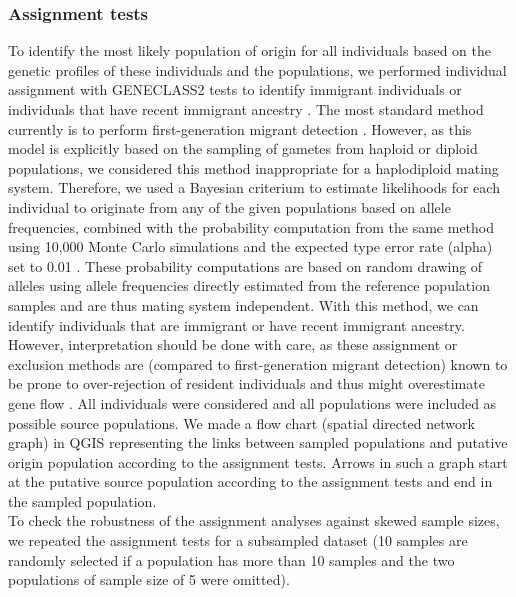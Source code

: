 \documentclass[10pt, twoside]{book} %
\begin{document}
	\subsubsection{Assignment tests}
	To identify the most likely population of origin for all individuals based on the genetic profiles of these individuals and the populations, we performed individual assignment with \textsc{GENECLASS2} tests to identify immigrant individuals or individuals that have recent immigrant ancestry \citep{rannala1997, piry2004}. The most standard method currently is to perform first-generation migrant detection \citep{paetkau2004}. However, as this model is explicitly based on the sampling of gametes from haploid or diploid populations, we considered this method inappropriate for a haplodiploid mating system. Therefore, we used a Bayesian criterium to estimate likelihoods for each individual to originate from any of the given populations based on allele frequencies, combined with the probability computation from the same method using 10,000 Monte Carlo simulations and the expected type  error rate (alpha) set to 0.01 \citep{rannala1997}. These probability computations are based on random drawing of alleles using allele frequencies directly estimated from the reference population samples and are thus mating system independent. With this method, we can identify individuals that are immigrant or have recent immigrant ancestry. However, interpretation should be done with care, as these assignment or exclusion methods are (compared to first-generation migrant detection) known to be prone to over-rejection of resident individuals and thus might overestimate gene flow \citep{paetkau2004, piry2004}. All individuals were considered and all populations were included as possible source populations. We made a flow chart (spatial directed network graph) in QGIS \citep{qgisdevelopmentteam2020} representing the links between sampled populations and putative origin population according to the assignment tests. Arrows in such a graph start at the putative source population according to the assignment tests and end in the sampled population.\\
	
	To check the robustness of the assignment analyses against skewed sample sizes, we repeated the assignment tests for a subsampled dataset (10 samples are randomly selected if a population has more than 10 samples and the two populations of sample size of 5 were omitted).\\
	
\end{document}
